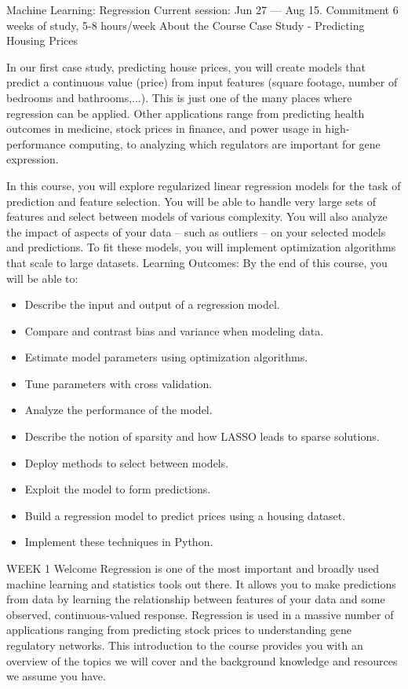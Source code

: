 Machine Learning: Regression
Current session: Jun 27 — Aug 15.
Commitment
6 weeks of study, 5-8 hours/week
About the Course
Case Study - Predicting Housing Prices

In our first case study, predicting house prices, you will create models that predict a continuous value (price) from input features (square footage, number of bedrooms and bathrooms,...).  This is just one of the many places where regression can be applied.  Other applications range from predicting health outcomes in medicine, stock prices in finance, and power usage in high-performance computing, to analyzing which regulators are important for gene expression.

In this course, you will explore regularized linear regression models for the task of prediction and feature selection.  You will be able to handle very large sets of features and select between models of various complexity.  You will also analyze the impact of aspects of your data -- such as outliers -- on your selected models and predictions.  To fit these models, you will implement optimization algorithms that scale to large datasets.
Learning Outcomes:  By the end of this course, you will be able to:
\begin{itemize}
   \item Describe the input and output of a regression model.
   \item Compare and contrast bias and variance when modeling data.
   \item Estimate model parameters using optimization algorithms.
   \item Tune parameters with cross validation.
   \item Analyze the performance of the model.
   \item Describe the notion of sparsity and how LASSO leads to sparse solutions.
   \item Deploy methods to select between models.
   \item Exploit the model to form predictions. 
   \item Build a regression model to predict prices using a housing dataset.
   \item Implement these techniques in Python.
\end{itemize}
WEEK 1
Welcome
Regression is one of the most important and broadly used machine learning and statistics tools out there. It allows you to make predictions from data by learning the relationship between features of your data and some observed, continuous-valued response. Regression is used in a massive number of applications ranging from predicting stock prices to understanding gene regulatory networks.
This introduction to the course provides you with an overview of the topics we will cover and the background knowledge and resources we assume you have.

